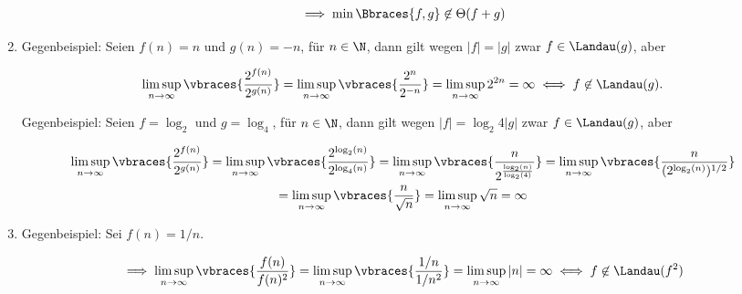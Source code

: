 \begin{solution}
\begin{enumerate}[label = (\alph*)]
  \begin{align*}
    \implies
    \min \Bbraces{f, g} \not \in \Theta(f + g)
  \end{align*}

  \item Gegenbeispiel:
  Seien $f(n) = n$ und $g(n) = -n$, für $n \in \N$, dann gilt wegen $|f| = |g|$ zwar $f \in \Landau(g)$, aber

  \begin{align*}
    \limsup_{n \to \infty}
    \vbraces
    {
      \frac
      {
        2^{f(n)}
      }{
        2^{g(n)}
      }
    }
    =
    \limsup_{n \to \infty}
    \vbraces
    {
      \frac
      {
        2^{n}
      }{
        2^{-n}
      }
    }
    =
    \limsup_{n \to \infty}
    2^{2n}
    =
    \infty
    \iff
    f \not \in \Landau(g).
  \end{align*}

  Gegenbeispiel:
  Seien $f = \log_2$ und $g = \log_4$, für $n \in \N$, dann gilt wegen $|f| = \log_2{4} |g|$ zwar $f \in \Landau(g)$, aber

  \begin{multline*}
    \limsup_{n  \to \infty}
    \vbraces
    {
      \frac
      {
        2^{f(n)}
      }{
        2^{g(n)}
      }
    }
    =
    \limsup_{n  \to \infty}
    \vbraces
    {
      \frac
      {
        2^{\log_2(n)}
      }{
        2^{\log_4(n)}
      }
    }
    =
    \limsup_{n  \to \infty}
    \vbraces
    {
      \frac
      {
        n
      }{
        2^\frac
        {
          \log_2(n)
        }{
          \log_2(4)
        }
      }
    }
    =
    \limsup_{n  \to \infty}
    \vbraces
    {
      \frac
      {
        n
      }{
        (2^{\log_2(n)})^{1/2}
      }
    } \\
    =
    \limsup_{n  \to \infty}
    \vbraces
    {
      \frac
      {
        n
      }{
        \sqrt{n}
      }
    }
    =
    \limsup_{n  \to \infty}
    \sqrt{n}
    =
    \infty
  \end{multline*}

  \item Gegenbeispiel:
  Sei $f(n) = 1/n$.

  \begin{align*}
    \implies
    \limsup_{n \to \infty}
    \vbraces
    {
      \frac{f(n)}{f(n)^2}
    }
    =
    \limsup_{n \to \infty}
    \vbraces
    {
      \frac{1/n}{1/n^2}
    }
    =
    \limsup_{n \to \infty} |n|
    =
    \infty
    \iff
    f \not \in \Landau(f^2)
  \end{align*}


\end{enumerate}
\end{solution}
